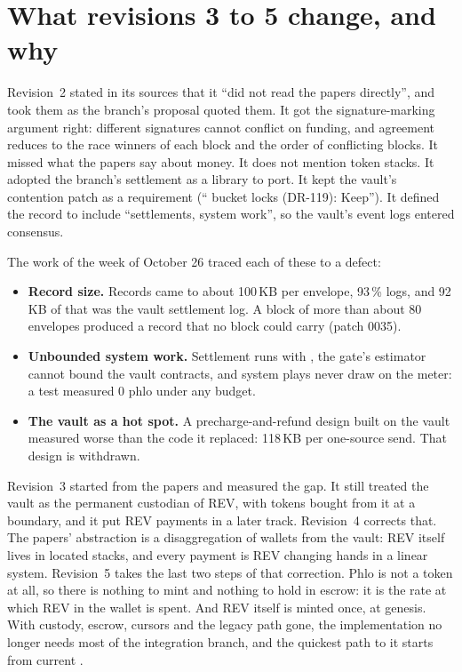 \documentclass[11pt]{article}
\newcommand{\code}{\path}
\begin{document}
\section{What revisions 3 to 5 change, and why}\label{sec:changes}

Revision~2 stated in its sources that it ``did not read the papers directly'', and took them as the branch's proposal quoted them. It got the signature-marking argument right: different signatures cannot conflict on funding, and agreement reduces to the race winners of each block and the order of conflicting blocks. It missed what the papers say about money. It does not mention token stacks. It adopted the branch's settlement as a library to port. It kept the vault's contention patch as a requirement (``\code{SystemVault.rho} bucket locks (DR-119): Keep''). It defined the record to include ``settlements, system work'', so the vault's event logs entered consensus.

The work of the week of October 26 traced each of these to a defect:
\begin{itemize}
\item \textbf{Record size.} Records came to about 100\,KB per envelope, 93\,\% logs, and 92\,KB of that was the vault settlement log. A block of more than about 80 envelopes produced a record that no block could carry (patch 0035).
\item \textbf{Unbounded system work.} Settlement runs with \code{Cost::unsafe_max()}, the gate's estimator cannot bound the vault contracts, and system plays never draw on the meter: a test measured 0 phlo under any budget.
\item \textbf{The vault as a hot spot.} A precharge-and-refund design built on the vault measured worse than the code it replaced: 118\,KB per one-source send. That design is withdrawn.
\end{itemize}

Revision~3 started from the papers and measured the gap. It still treated the vault as the permanent custodian of REV, with tokens bought from it at a boundary, and it put REV payments in a later track. Revision~4 corrects that. The papers' abstraction is a disaggregation of wallets from the vault: REV itself lives in located stacks, and every payment is REV changing hands in a linear system. Revision~5 takes the last two steps of that correction. Phlo is not a token at all, so there is nothing to mint and nothing to hold in escrow: it is the rate at which REV in the wallet is spent. And REV itself is minted once, at genesis. With custody, escrow, cursors and the legacy path gone, the implementation no longer needs most of the integration branch, and the quickest path to it starts from current \code{dev}.
\end{document}

